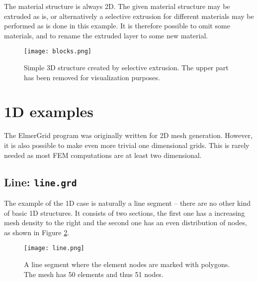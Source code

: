 The material structure is always 2D. 
The given material structure may be 
extruded as is, or alternatively a selective extrusion for
different materials may be performed as is done in this example.
It is therefore possible to omit some materials, and to rename 
the extruded layer to some new material.



\begin{figure}[H]
\centering
\texttt{[image: blocks.png]}
\caption{Simple 3D structure created by selective extrusion. 
	The upper part has been removed for visualization purposes.}
\label{fg:pic11}
\end{figure}


\section{1D examples}

The ElmerGrid program was originally written for 2D mesh generation. 
However, it is also possible to make even more trivial one dimensional grids.
This is rarely needed as most FEM computations are at least two dimensional.

\subsection*{Line: \texttt{line.grd}}

The example of the 1D case is naturally a line segment -- there are no other kind of basic 1D structures.
It consists of two sections, the first one has a increasing mesh density to the right and the second one
has an even distribution of nodes, as shown in Figure \ref{fg:pic12}.


\begin{figure}[H]
\centering
\texttt{[image: line.png]} 
\caption{A line segment where the element nodes are marked with polygons.
The mesh has 50 elements and thus 51 nodes.}
\label{fg:pic12}
\end{figure}
